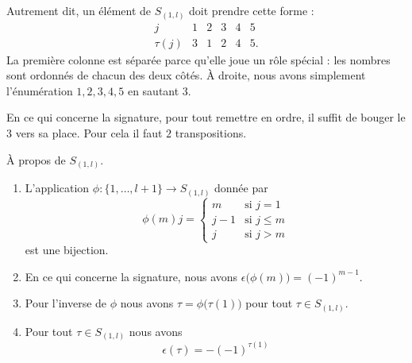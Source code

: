 Autrement dit, un élément de \( S_{(1,l)}\) doit prendre cette forme :
\begin{equation}
	\begin{array}{cc|cccc}
		j       & 1 & 2 & 3 & 4 & 5  \\
		\tau(j) & 3 & 1 & 2 & 4 & 5.
	\end{array}
\end{equation}
La première colonne est séparée parce qu'elle joue un rôle spécial : les nombres sont ordonnés de chacun des deux côtés. À droite, nous avons simplement l'énumération \( 1,2,3,4,5\) en sautant \( 3\).

En ce qui concerne la signature, pour tout remettre en ordre, il suffit de bouger le \( 3\) vers sa place. Pour cela il faut \( 2\) transpositions.


\begin{lemma}		\label{LEMooDBIEooYcjlDP}
	À propos de \( S_{(1,l)}\).
	\begin{enumerate}
		\item
		      L'application \(\phi \colon \{ 1,\ldots,l+1 \}\to S_{(1,l)}  \) donnée par
		      \begin{equation}		\label{EQooRALSooPWvZPd}
			      \phi(m)j=\begin{cases}
				      m   & \text{si } j=1    \\
				      j-1 & \text{si }j\leq m \\
				      j   & \text{si }j>m
			      \end{cases}
		      \end{equation}
		      est une bijection.
		\item		\label{ITEMooRIHAooItlkCh}
		      En ce qui concerne la signature, nous avons \( \epsilon\big( \phi(m) \big)=(-1)^{m-1}\).
		\item		\label{ITEMooCOPZooLiUPWE}
		      Pour l'inverse de \( \phi\) nous avons \( \tau=\phi\big( \tau(1) \big)\) pour tout \( \tau\in S_{(1,l)}\).
		\item  \label{ITEMooHMNFooENphGK}
		      Pour tout \( \tau\in S_{(1,l)}\) nous avons
		      \begin{equation}
			      \epsilon(\tau)=-(-1)^{\tau(1)}
		      \end{equation}
	\end{enumerate}
\end{lemma}


